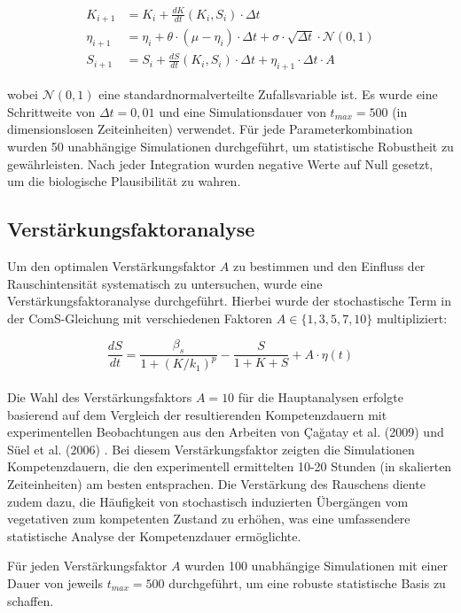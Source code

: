 \documentclass[11pt]{article}
\begin{document}
\begin{align}
K_{i+1} &= K_i + \frac{dK}{dt}(K_i, S_i) \cdot \Delta t \\
\eta_{i+1} &= \eta_i + \theta \cdot (\mu - \eta_i) \cdot \Delta t + \sigma \cdot \sqrt{\Delta t} \cdot \mathcal{N}(0,1) \\
S_{i+1} &= S_i + \frac{dS}{dt}(K_i, S_i) \cdot \Delta t + \eta_{i+1} \cdot \Delta t \cdot A
\end{align}

wobei $\mathcal{N}(0,1)$ eine standardnormalverteilte Zufallsvariable ist. Es wurde eine Schrittweite von $\Delta t = 0,01$ und eine Simulationsdauer von $t_{max} = 500$ (in dimensionslosen Zeiteinheiten) verwendet. Für jede Parameterkombination wurden 50 unabhängige Simulationen durchgeführt, um statistische Robustheit zu gewährleisten. Nach jeder Integration wurden negative Werte auf Null gesetzt, um die biologische Plausibilität zu wahren.

\subsection{Verstärkungsfaktoranalyse}
Um den optimalen Verstärkungsfaktor $A$ zu bestimmen und den Einfluss der Rauschintensität systematisch zu untersuchen, wurde eine Verstärkungsfaktoranalyse durchgeführt. Hierbei wurde der stochastische Term in der ComS-Gleichung mit verschiedenen Faktoren $A \in \{1, 3, 5, 7, 10\}$ multipliziert:

\begin{equation}
\frac{dS}{dt} = \frac{\beta_s}{1 + (K/k_1)^p} - \frac{S}{1 + K + S} + A \cdot \eta(t)
\end{equation}
\\
Die Wahl des Verstärkungsfaktors $A = 10$ für die Hauptanalysen erfolgte basierend auf dem Vergleich der resultierenden Kompetenzdauern mit experimentellen Beobachtungen aus den Arbeiten von Çağatay et al. (2009) \cite{cagatay2009} und Süel et al. (2006) \cite{suel2006}. Bei diesem Verstärkungsfaktor zeigten die Simulationen Kompetenzdauern, die den experimentell ermittelten 10-20 Stunden (in skalierten Zeiteinheiten) am besten entsprachen. Die Verstärkung des Rauschens diente zudem dazu, die Häufigkeit von stochastisch induzierten Übergängen vom vegetativen zum kompetenten Zustand zu erhöhen, was eine umfassendere statistische Analyse der Kompetenzdauer ermöglichte.

Für jeden Verstärkungsfaktor $A$ wurden 100 unabhängige Simulationen mit einer Dauer von jeweils $t_{max} = 500$ durchgeführt, um eine robuste statistische Basis zu schaffen. 
\end{document}
